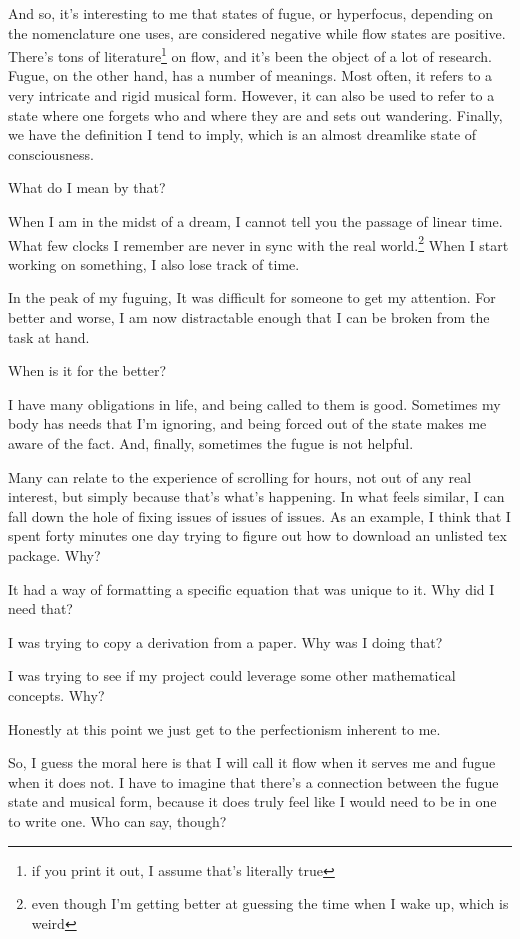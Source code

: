 \documentclass[12pt]{article}
\renewcommand{\,}{\textsuperscript{,}}
\begin{document}
And so, it's interesting to me that states of fugue, or hyperfocus, depending on the nomenclature one uses, are considered negative while flow states are positive.  
There's tons of literature\footnote{if you print it out, I assume that's literally true} on flow, and it's been the object of a lot of research.  
Fugue, on the other hand, has a number of meanings.  
Most often, it refers to a very intricate and rigid musical form.  
However, it can also be used to refer to a state where one forgets who and where they are and sets out wandering.  
Finally, we have the definition I tend to imply, which is an almost dreamlike state of consciousness.

What do I mean by that?

When I am in the midst of a dream, I cannot tell you the passage of linear time.  
What few clocks I remember are never in sync with the real world.\footnote{even though I'm getting better at guessing the time when I wake up, which is weird}  
When I start working on something, I also lose track of time.

In the peak of my fuguing, It was difficult for someone to get my attention.  
For better and worse, I am now distractable enough that I can be broken from the task at hand.

When is it for the better?

I have many obligations in life, and being called to them is good.  
Sometimes my body has needs that I'm ignoring, and being forced out of the state makes me aware of the fact.  
And, finally, sometimes the fugue is not helpful.

Many can relate to the experience of scrolling for hours, not out of any real interest, but simply because that's what's happening.  
In what feels similar, I can fall down the hole of fixing issues of issues of issues.  
As an example, I think that I spent forty minutes one day trying to figure out how to download an unlisted tex package.  
Why?

It had a way of formatting a specific equation that was unique to it.  
Why did I need that?

I was trying to copy a derivation from a paper.  
Why was I doing that?

I was trying to see if my project could leverage some other mathematical concepts.  
Why?

Honestly at this point we just get to the perfectionism inherent to me.

So, I guess the moral here is that I will call it flow when it serves me and fugue when it does not.  
I have to imagine that there's a connection between the fugue state and musical form, because it does truly feel like I would need to be in one to write one.  
Who can say, though?
\end{document}
